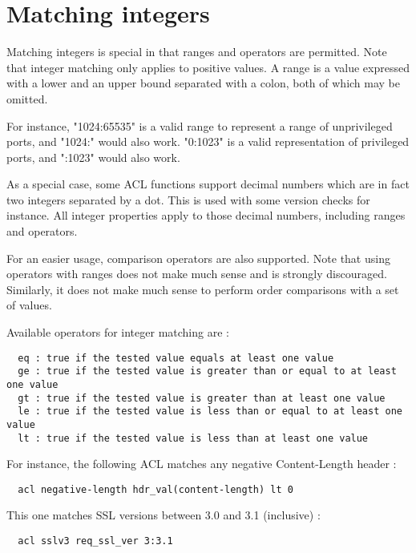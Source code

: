 
\section{Matching integers}

Matching integers is special in that ranges and operators are permitted. Note
that integer matching only applies to positive values. A range is a value
expressed with a lower and an upper bound separated with a colon, both of which
may be omitted.


For instance, "1024:65535" is a valid range to represent a range of
unprivileged ports, and "1024:" would also work. "0:1023" is a valid
representation of privileged ports, and ":1023" would also work.


As a special case, some ACL functions support decimal numbers which are in fact
two integers separated by a dot. This is used with some version checks for
instance. All integer properties apply to those decimal numbers, including
ranges and operators.


For an easier usage, comparison operators are also supported. Note that using
operators with ranges does not make much sense and is strongly discouraged.
Similarly, it does not make much sense to perform order comparisons with a set
of values.


Available operators for integer matching are :

\begin{verbatim}
  eq : true if the tested value equals at least one value
  ge : true if the tested value is greater than or equal to at least one value
  gt : true if the tested value is greater than at least one value
  le : true if the tested value is less than or equal to at least one value
  lt : true if the tested value is less than at least one value
\end{verbatim}


For instance, the following ACL matches any negative Content-Length header :

\begin{verbatim}
  acl negative-length hdr_val(content-length) lt 0
\end{verbatim}


This one matches SSL versions between 3.0 and 3.1 (inclusive) :

\begin{verbatim}
  acl sslv3 req_ssl_ver 3:3.1
\end{verbatim}

